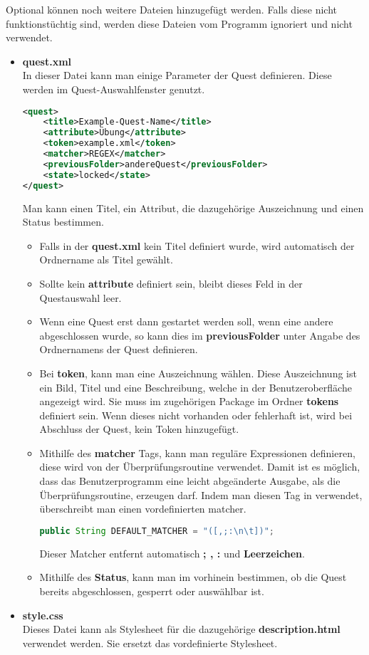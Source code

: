 Optional können noch weitere Dateien hinzugefügt werden. Falls diese nicht funktionstüchtig sind, werden diese Dateien vom Programm ignoriert und nicht verwendet.

\begin{itemize}
\item \textbf{quest.xml}\\
In dieser Datei kann man einige Parameter der Quest definieren. Diese werden im Quest-Auswahlfenster genutzt.

\begin{lstlisting}[language=XML]
<quest>
    <title>Example-Quest-Name</title>
    <attribute>Übung</attribute>
    <token>example.xml</token>
    <matcher>REGEX</matcher>
    <previousFolder>andereQuest</previousFolder>
    <state>locked</state>
</quest>
\end{lstlisting}
Man kann einen Titel, ein Attribut, die dazugehörige Auszeichnung und einen Status bestimmen.
\begin{itemize}
\item Falls in der \textbf{quest.xml} kein Titel definiert wurde, wird automatisch der Ordnername als Titel gewählt. 
\item Sollte kein \textbf{attribute} definiert sein, bleibt dieses Feld in der Questauswahl leer.
\item Wenn eine Quest erst dann gestartet werden soll, wenn eine andere abgeschlossen wurde, so kann dies im \textbf{previousFolder} unter Angabe des Ordnernamens der Quest definieren.
\item Bei \textbf{token}, kann man eine Auszeichnung wählen. Diese Auszeichnung ist ein Bild, Titel und eine Beschreibung, welche in der Benutzeroberfläche angezeigt wird. Sie muss im zugehörigen Package im Ordner \textbf{tokens} definiert sein. Wenn dieses nicht vorhanden oder fehlerhaft ist, wird bei Abschluss der Quest, kein Token hinzugefügt.
\item Mithilfe des \textbf{matcher} Tags, kann man reguläre Expressionen definieren, diese wird von der Überprüfungsroutine verwendet. Damit ist es möglich, dass das Benutzerprogramm eine leicht abgeänderte Ausgabe, als die Überprüfungsroutine, erzeugen darf. Indem man diesen Tag in verwendet, überschreibt man einen vordefinierten matcher.

\begin{lstlisting}[language=JAVA]
	public String DEFAULT_MATCHER = "([,;:\n\t])";
\end{lstlisting}
Dieser Matcher entfernt automatisch \textbf{; , :} und \textbf{Leerzeichen}.

\item Mithilfe des \textbf{Status}, kann man im vorhinein bestimmen, ob die Quest bereits abgeschlossen, gesperrt oder auswählbar ist.
\end{itemize}

\item \textbf{style.css}\\
Dieses Datei kann als Stylesheet für die dazugehörige \textbf{description.html} verwendet werden. Sie ersetzt das vordefinierte Stylesheet.

\end{itemize}

